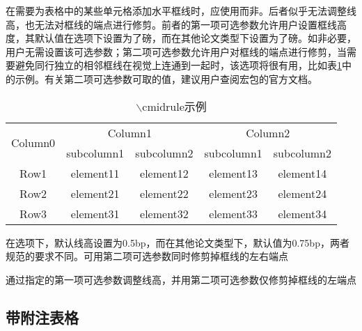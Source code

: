 \documentclass[print, doctor, vlined]{DissertUESTC}
\begin{document}
	在需要为表格中的某些单元格添加水平框线时，应使用\newline{}而非。后者似乎无法调整线高，也无法对框线的端点进行修剪。前者的第一项可选参数允许用户设置框线高度，其默认值在选项下设置为了磅，而在其他论文类型下设置为了磅。如非必要，用户无需设置该可选参数；第二项可选参数允许用户对框线的端点进行修剪，当需要避免同行独立的相邻框线在视觉上连通到一起时，该选项将很有用，比如表\ref{tab: cmidrule示例}中的示例。有关第二项可选参数可取的值，建议用户查阅\href{https://mirrors.sustech.edu.cn/CTAN/macros/latex/contrib/booktabs/booktabs.pdf}{}宏包的官方文档。
	
	\begin{table}[htp]
		\caption{$\backslash$cmidrule示例}\label{tab: cmidrule示例}
		\begin{threeparttable}
			\begin{tabular}{ccccc}
				\toprule
				\multirow{2}{*}{Column0} &  \multicolumn{2}{c}{Column1\tnote{1}} & \multicolumn{2}{c}{Column2\tnote{2}} \\
				\cmidrule(lr){2-3}\cmidrule[2.5bp](l){4-5}
				~     & subcolumn1 & subcolumn2 & subcolumn1 & subcolumn2 \\
				\midrule
				Row1  & element11 & element12 &element13 & element14 \\
				Row2  & element21 & element22 &element23 & element24 \\
				\cmidrule{2-3}\cmidrule[2.5bp]{4-5}
				Row3  & element31 & element32 &element33 & element34 \\
				\bottomrule
			\end{tabular}
			\begin{tablenotes}
				\item[1] 在选项下，默认线高设置为0.5bp，而在其他论文类型下，默认值为0.75bp，两者规范的要求不同。可用第二项可选参数同时修剪掉框线的左右端点
				\item[2] 通过指定的第一项可选参数调整线高，并用第二项可选参数仅修剪掉框线的左端点
			\end{tablenotes}
		\end{threeparttable}
	\end{table}

	
	\newpage
	\subsection{带附注表格}
	
\end{document}
